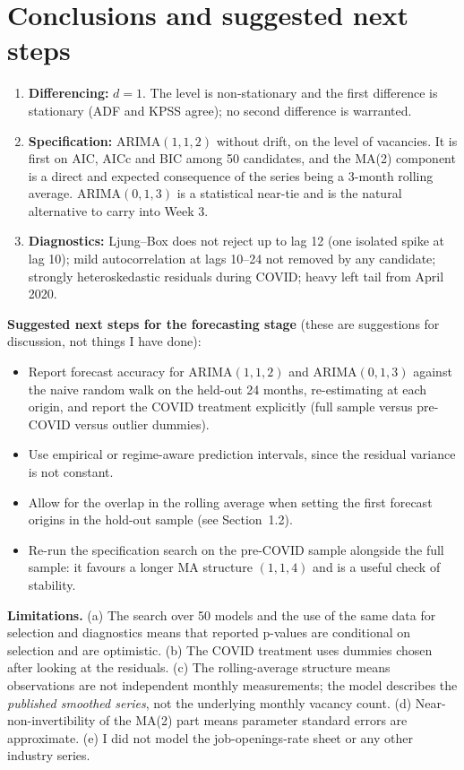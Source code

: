 \documentclass[11pt,a4paper]{article}
\newcommand{\ARIMA}[3]{\mathrm{ARIMA}(#1,#2,#3)}
\begin{document}
\section{Conclusions and suggested next steps}
\begin{enumerate}
\item \textbf{Differencing:} $d=1$. The level is non-stationary and the first difference is stationary (ADF and KPSS agree); no second difference is warranted.
\item \textbf{Specification:} $\ARIMA{1}{1}{2}$ without drift, on the level of vacancies. It is first on AIC, AICc and BIC among 50 candidates, and the MA(2) component is a direct and expected consequence of the series being a 3-month rolling average. $\ARIMA{0}{1}{3}$ is a statistical near-tie and is the natural alternative to carry into Week 3.
\item \textbf{Diagnostics:} Ljung--Box does not reject up to lag 12 (one isolated spike at lag 10); mild autocorrelation at lags 10--24 not removed by any candidate; strongly heteroskedastic residuals during COVID; heavy left tail from April 2020.
\end{enumerate}

\textbf{Suggested next steps for the forecasting stage} (these are suggestions for discussion, not things I have done):
\begin{itemize}
\item Report forecast accuracy for $\ARIMA{1}{1}{2}$ and $\ARIMA{0}{1}{3}$ against the naive random walk on the held-out 24 months, re-estimating at each origin, and report the COVID treatment explicitly (full sample versus pre-COVID versus outlier dummies).
\item Use empirical or regime-aware prediction intervals, since the residual variance is not constant.
\item Allow for the overlap in the rolling average when setting the first forecast origins in the hold-out sample (see Section~1.2).
\item Re-run the specification search on the pre-COVID sample alongside the full sample: it favours a longer MA structure $(1,1,4)$ and is a useful check of stability.
\end{itemize}

\textbf{Limitations.} (a) The search over 50 models and the use of the same data for selection and diagnostics means that reported p-values are conditional on selection and are optimistic. (b) The COVID treatment uses dummies chosen after looking at the residuals. (c) The rolling-average structure means observations are not independent monthly measurements; the model describes the \emph{published smoothed series}, not the underlying monthly vacancy count. (d) Near-non-invertibility of the MA(2) part means parameter standard errors are approximate. (e) I did not model the job-openings-rate sheet or any other industry series.
\end{document}
